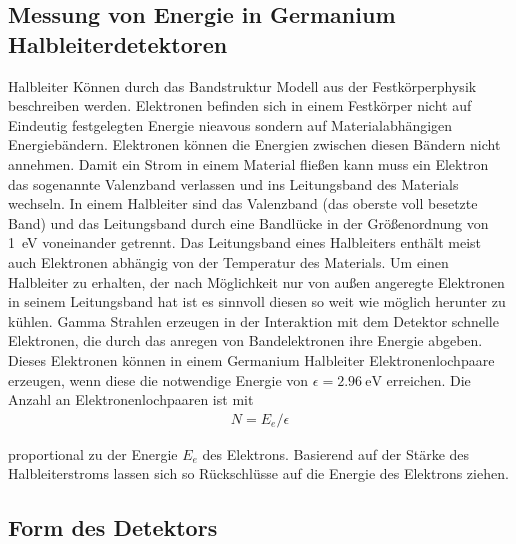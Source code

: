 \subsection{Messung von Energie in Germanium Halbleiterdetektoren \cite{book:gil}}

Halbleiter Können durch das Bandstruktur Modell aus der Festkörperphysik
beschreiben werden. Elektronen befinden sich in einem Festkörper nicht auf
Eindeutig festgelegten Energie nieavous sondern auf Materialabhängigen
Energiebändern. Elektronen können die Energien zwischen diesen Bändern nicht
annehmen. Damit ein Strom in einem Material fließen kann muss ein Elektron das
sogenannte Valenzband verlassen und ins Leitungsband des Materials wechseln. In
einem Halbleiter sind das Valenzband (das oberste voll besetzte Band) und das
Leitungsband durch eine Bandlücke in der Größenordnung von \qty{1}{\eV}
voneinander getrennt.
Das Leitungsband eines Halbleiters enthält meist auch Elektronen abhängig von
der Temperatur des Materials.
Um einen Halbleiter zu erhalten, der nach Möglichkeit nur von außen angeregte
Elektronen in seinem Leitungsband hat ist es sinnvoll diesen so weit wie
möglich herunter zu kühlen. Gamma Strahlen erzeugen in der Interaktion mit dem
Detektor schnelle Elektronen, die durch das anregen von Bandelektronen ihre
Energie abgeben. Dieses Elektronen können in einem Germanium Halbleiter
Elektronenlochpaare erzeugen, wenn diese die notwendige Energie von $\epsilon =
	\qty{2.96}{\eV}$ erreichen. Die Anzahl an Elektronenlochpaaren ist mit
\begin{align}
	N = E_e / \epsilon
\end{align}

proportional zu der Energie $E_e$ des Elektrons. Basierend auf der Stärke des
Halbleiterstroms lassen sich so Rückschlüsse auf die Energie des Elektrons
ziehen.


\subsection{Form des Detektors \cite[vgl][Kap. 2.4]{book:gil}}

